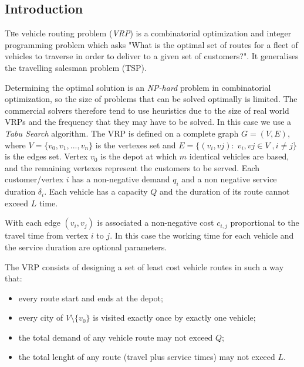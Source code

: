 \documentclass[twoside]{article}
\begin{document}
\begin{multicols}{2} %

\section{Introduction}

\lettrine[nindent=0em,lines=3]{T}he vehicle routing problem (\emph{VRP}) is a combinatorial optimization and integer programming problem which asks "What is the optimal set of routes for a fleet of vehicles to traverse in order to deliver to a given set of customers?". It generalises the travelling salesman problem (TSP).

Determining the optimal solution is an \textit{NP-hard} problem in combinatorial optimization, so the size of problems that can be solved optimally is limited. The commercial solvers therefore tend to use heuristics due to the size of real world VRPs and the frequency that they may have to be solved. In this case we use a \emph{Tabu Search} algorithm.\newline
The VRP is defined on a complete graph $G=(V,E)$, where $V=\{v_{0}, v_{1},...,v_{n}\}$ is the vertexes set and $E=\{(v_{i},v{j}):\; v_{i},v{j}\in V\;, i\neq j\}$ is the edges set. Vertex $v_{0}$ is the depot at which $m$ identical vehicles are based, and the remaining vertexes represent the customers to be served. Each customer/vertex \textit{$i$} has a non-negative demand $q_{i}$ and a non negative service duration $\delta_{i}$. Each vehicle has a capacity $Q$ and the duration of its route cannot exceed $L$ time.

With each edge $(v_{i},v_{j})$ is associated a non-negative cost $c_{i,j}$ proportional to the travel time from vertex $i$ to $j$.
In this case the working time for each vehicle and the service duration are optional parameters.

The VRP consists of designing a set of least cost vehicle routes in such a way that:
\begin{itemize}
	\item every route start and ends at the depot;
	\item every city of $V\setminus\{v_{0}\}$ is visited exactly once by exactly one vehicle;
	\item the total demand of any vehicle route may not exceed $Q$;
	\item the total lenght of any route (travel plus service times) may not exceed $L$.
\end{itemize}


\end{multicols}
\end{document}
